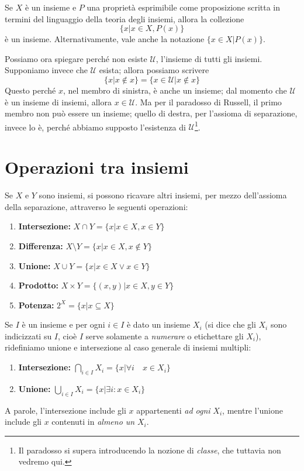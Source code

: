 \documentclass[oneside]{book}
\begin{document}
\begin{tcolorbox}[colback=yellow!30, colframe=yellow!30!black, title={Assioma della separazione}]
Se $X$ è un insieme e $P$ una proprietà esprimibile come proposizione
scritta in termini del linguaggio della teoria degli insiemi, allora
la collezione
\[ \{x|x\in X, P(x)\} \]
è un insieme. Alternativamente, vale anche la notazione $\{x\in X|P(x)\}$.
\end{tcolorbox}

Possiamo ora spiegare perché non esiste $\mathcal{U}$, l'insieme di tutti
gli insiemi. Supponiamo invece che $\mathcal{U}$ esista; allora possiamo
scrivere
\[ \{x|x\not\in x\} = \{x\in\mathcal{U}|x\not\in x\} \]
Questo perché $x$, nel membro di sinistra, è anche un insieme; dal momento
che $\mathcal{U}$ è un insieme di insiemi, allora $x\in\mathcal{U}$.
Ma per il paradosso di Russell, il primo membro non può essere un insieme;
quello di destra, per l'assioma di separazione, invece lo è, perché abbiamo
supposto l'esistenza di $\mathcal{U}$\footnote{Il paradosso si supera
introducendo la nozione di \textit{classe}, che tuttavia non vedremo qui.}.

\section{Operazioni tra insiemi}
Se $X$ e $Y$ sono insiemi, si possono ricavare altri insiemi, per mezzo
dell'assioma della separazione, attraverso le seguenti operazioni:
\begin{enumerate}
\item \textbf{Intersezione:} $X\cap Y=\{x|x\in X, x\in Y\}$
\item \textbf{Differenza:} $X\setminus Y=\{x|x\in X,x\not\in Y\}$
\item \textbf{Unione:} $X\cup Y=\{x|x\in X \vee x\in Y\}$
\item \textbf{Prodotto:} $X\times Y=\{(x,y)|x\in X, y\in Y\}$
\item \textbf{Potenza:} $2^X=\{x|x\subseteq X\}$
\end{enumerate}
Se $I$ è un insieme e per ogni $i\in I$ è dato un insieme $X_i$
(si dice che gli $X_i$ sono indicizzati su $I$, cioè $I$ serve
solamente a \emph{numerare} o etichettare gli $X_i$), ridefiniamo
unione e intersezione al caso generale di insiemi multipli:
\begin{enumerate}
\item \textbf{Intersezione:} $\bigcap_{i\in I}X_i=\{x|\forall i \quad x\in X_i\}$
\item \textbf{Unione:} $\bigcup_{i\in I}X_i=\{x|\exists i:x\in X_i\}$
\end{enumerate}
A parole, l'intersezione include gli $x$ appartenenti \textit{ad ogni}
$X_i$, mentre l'unione include gli $x$ contenuti in \textit{almeno un}
$X_i$.
\end{document}
